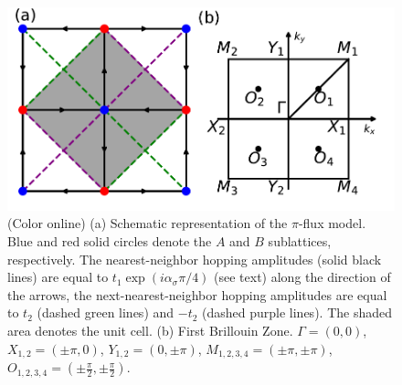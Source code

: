 \documentclass[amsmath,superscriptaddress,showpacs,aps,prb,twocolumn]{revtex4-1}
\begin{document}
\begin{figure}
\includegraphics[width=\columnwidth]{lattice}
\caption{(Color online) (a) Schematic representation of the $\pi$-flux model. Blue and red solid circles denote the $A$ and $B$ sublattices, respectively. The nearest-neighbor hopping amplitudes (solid black lines) are equal to $t_{1}\exp(i\alpha_{\sigma}\pi/4)$ (see text) along the direction of the arrows, the next-nearest-neighbor hopping amplitudes are equal to $t_{2}$ (dashed green lines) and $-t_{2}$ (dashed purple lines). The shaded area denotes the unit cell. (b) First Brillouin Zone. $\Gamma=(0,0)$, $X_{1,2}=(\pm\pi,0)$, $Y_{1,2}=(0,\pm\pi)$, $M_{1,2,3,4}=(\pm\pi,\pm\pi)$, $O_{1,2,3,4}=(\pm\frac{\pi}{2},\pm\frac{\pi}{2})$.}
\label{lattice}
\end{figure}
\end{document}
